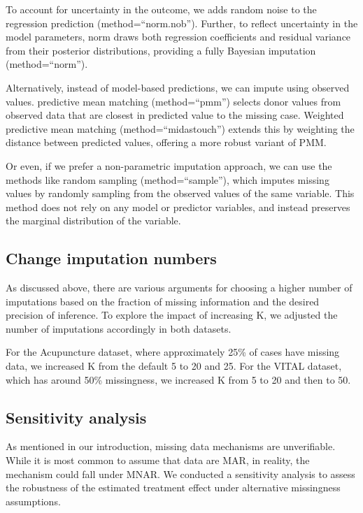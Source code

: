 \documentclass{article}
\begin{document}
To account for uncertainty in the outcome, we adds random noise to the
regression prediction (method=``norm.nob''). Further, to reflect
uncertainty in the model parameters, norm draws both regression
coefficients and residual variance from their posterior distributions,
providing a fully Bayesian imputation (method=``norm'').

Alternatively, instead of model-based predictions, we can impute using
observed values. predictive mean matching (method=``pmm'') selects donor
values from observed data that are closest in predicted value to the
missing case. Weighted predictive mean matching (method=``midastouch'')
extends this by weighting the distance between predicted values,
offering a more robust variant of PMM.

Or even, if we prefer a non-parametric imputation approach, we can use
the methods like random sampling (method=``sample''), which imputes
missing values by randomly sampling from the observed values of the same
variable. This method does not rely on any model or predictor variables,
and instead preserves the marginal distribution of the variable.

\subsection{Change imputation numbers}\label{change-imputation-numbers}

As discussed above, there are various arguments for choosing a higher
number of imputations based on the fraction of missing information and
the desired precision of inference. To explore the impact of increasing
K, we adjusted the number of imputations accordingly in both datasets.

For the Acupuncture dataset, where approximately 25\% of cases have
missing data, we increased K from the default 5 to 20 and 25. For the
VITAL dataset, which has around 50\% missingness, we increased K from 5
to 20 and then to 50.

\subsection{Sensitivity analysis}\label{sensitivity-analysis-1}

As mentioned in our introduction, missing data mechanisms are
unverifiable. While it is most common to assume that data are MAR, in
reality, the mechanism could fall under MNAR. We conducted a sensitivity
analysis to assess the robustness of the estimated treatment effect
under alternative missingness assumptions.
\end{document}

